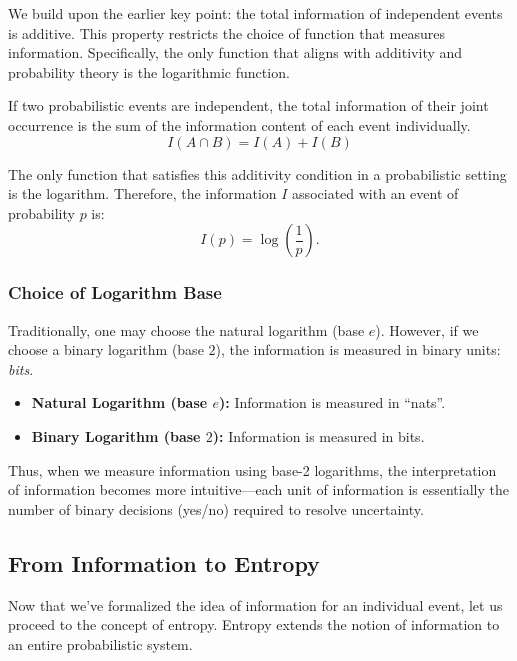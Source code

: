 \documentclass[12pt,a4paper]{article}
\newenvironment{thmbox}[1][]{%
  \begin{tcolorbox}[enhanced, breakable, colback=thmcolor, colframe=blue!50!black, title=#1, fonttitle=\bfseries, arc=3pt, boxrule=0.5pt]
}{\end{tcolorbox}}
\newenvironment{rembox}[1][]{%
  \begin{tcolorbox}[enhanced, breakable, colback=gray!5, colframe=gray!50, title=#1, fonttitle=\bfseries, arc=3pt, boxrule=0.5pt]
}{\end{tcolorbox}}
\begin{document}
We build upon the earlier key point: the total information of independent events is additive. This property restricts the choice of function that measures information. Specifically, the only function that aligns with additivity and probability theory is the logarithmic function.

\begin{thmbox}[Additivity of Information]
If two probabilistic events are independent, the total information of their joint occurrence is the sum of the information content of each event individually.
\begin{equation}
    I(A \cap B) = I(A) + I(B)
\end{equation}
\end{thmbox}

The only function that satisfies this additivity condition in a probabilistic setting is the logarithm. Therefore, the information $I$ associated with an event of probability $p$ is:
\[
I(p) = \log\left(\frac{1}{p}\right).
\]

\subsubsection{Choice of Logarithm Base}

Traditionally, one may choose the natural logarithm (base $e$). However, if we choose a binary logarithm (base $2$), the information is measured in binary units: \emph{bits}.

\begin{rembox}[Units of Information]
    \begin{itemize}
        \item \textbf{Natural Logarithm (base $e$):} Information is measured in “nats”.
        \item \textbf{Binary Logarithm (base $2$):} Information is measured in bits.
    \end{itemize}
\end{rembox}

Thus, when we measure information using base-2 logarithms, the interpretation of information becomes more intuitive—each unit of information is essentially the number of binary decisions (yes/no) required to resolve uncertainty.

\subsection{From Information to Entropy}

Now that we’ve formalized the idea of information for an individual event, let us proceed to the concept of entropy. Entropy extends the notion of information to an entire probabilistic system.
\end{document}
